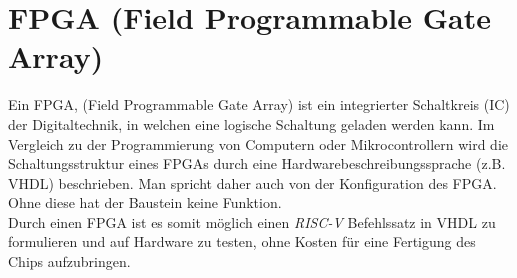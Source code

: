     \section{FPGA (Field Programmable Gate Array)}
        Ein FPGA, (Field Programmable Gate Array) ist ein integrierter Schaltkreis (IC) der Digitaltechnik,
        in welchen eine logische Schaltung geladen werden kann.
        Im Vergleich zu der Programmierung von Computern oder Mikrocontrollern wird die Schaltungsstruktur eines FPGAs durch eine
        Hardwarebeschreibungssprache (z.B. VHDL) beschrieben. Man spricht daher auch von der Konfiguration des FPGA.
        Ohne diese hat der Baustein keine Funktion. \cite{fpga-wiki}
        \\
        Durch einen FPGA ist es somit möglich einen \textit{RISC-V} Befehlssatz in VHDL zu formulieren und auf Hardware zu testen,
        ohne Kosten für eine Fertigung des Chips aufzubringen.

